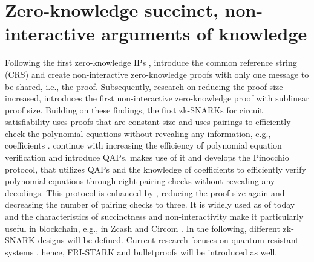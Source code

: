 \section{Zero-knowledge succinct, non-interactive arguments of knowledge}
Following the first zero-knowledge IPs \citep{GoldwasserIPs}, \citet{Blum1991} introduce the common reference string (CRS) and create non-interactive zero-knowledge proofs with only one message to be shared, i.e., the proof. Subsequently, research on reducing the proof size increased, \citet{MicaliArgSys} introduces the first non-interactive zero-knowledge proof with sublinear proof size. Building on these findings, the first zk-SNARKs for circuit satisfiability uses proofs that are constant-size and uses pairings to efficiently check the polynomial equations without revealing any information, e.g., coefficients \citep{Groth2010ShortPN}. \citet{GennaroLinPCP} continue with increasing the efficiency of polynomial equation verification and introduce QAPs. \citet{Pinocchio} makes use of it and develops the Pinocchio protocol, that utilizes QAPs and the knowledge of coefficients to efficiently verify polynomial equations through eight pairing checks without revealing any decodings. This protocol is enhanced by \citet{Groth2016OnTS}, reducing the proof size again and decreasing the number of pairing checks to three. It is widely used as of today and the characteristics of succinctness and non-interactivity make it particularly useful in blockchain, e.g., in Zcash and Circom \citep{chen2022review}. In the following, different zk-SNARK designs will be defined. Current research focuses on quantum resistant systems \citep{chen2022review}, hence, FRI-STARK and bulletproofs will be introduced as well. 


